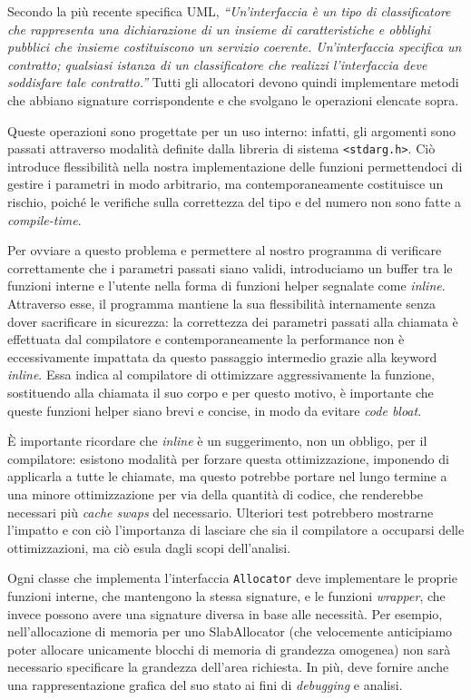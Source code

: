 Secondo la più recente specifica UML,  \textit{“Un'interfaccia è un tipo di classificatore che rappresenta una dichiarazione di un insieme di caratteristiche e obblighi pubblici che insieme costituiscono un servizio coerente. Un'interfaccia specifica un contratto; qualsiasi istanza di un classificatore che realizzi l'interfaccia deve soddisfare tale contratto.”} Tutti gli allocatori devono quindi implementare metodi che abbiano signature corrispondente e che svolgano le operazioni elencate sopra.



Queste operazioni sono progettate per un uso interno: infatti, gli argomenti sono passati attraverso modalità definite dalla libreria di sistema \texttt{<stdarg.h>}. Ciò introduce flessibilità nella nostra implementazione delle funzioni permettendoci di gestire i parametri in modo arbitrario, ma contemporaneamente costituisce un rischio, poiché le verifiche sulla correttezza del tipo e del numero non sono fatte a \textit{compile-time}.

Per ovviare a questo problema e permettere al nostro programma di verificare correttamente che i parametri passati siano validi, introduciamo un buffer tra le funzioni interne e l’utente nella forma di funzioni helper segnalate come \textit{inline}. Attraverso esse, il programma mantiene la sua flessibilità internamente senza dover sacrificare in sicurezza: la correttezza dei parametri passati alla chiamata è effettuata dal compilatore e contemporaneamente la performance non è eccessivamente impattata da questo passaggio intermedio grazie alla keyword \textit{inline}. Essa indica al compilatore di ottimizzare aggressivamente la funzione, sostituendo alla chiamata il suo corpo e per questo motivo, è importante che queste funzioni helper siano brevi e concise, in modo da evitare \textit{code bloat}.

È importante ricordare che \textit{inline} è un suggerimento, non un obbligo, per il compilatore: esistono modalità per forzare questa ottimizzazione, imponendo di applicarla a tutte le chiamate, ma questo potrebbe portare nel lungo termine a una minore ottimizzazione per via della quantità di codice, che renderebbe necessari più \textit{cache swaps} del necessario. Ulteriori test potrebbero mostrarne l’impatto e con ciò l’importanza di lasciare che sia il compilatore a occuparsi delle ottimizzazioni, ma ciò esula dagli scopi dell’analisi.

Ogni classe che implementa l’interfaccia \texttt{Allocator} deve implementare le proprie funzioni interne, che mantengono la stessa signature, e le funzioni \textit{wrapper}, che invece possono avere una signature diversa in base alle necessità. Per esempio, nell’allocazione di memoria per uno SlabAllocator (che velocemente anticipiamo poter allocare unicamente blocchi di memoria di grandezza omogenea) non sarà necessario specificare la grandezza dell’area richiesta. In più, deve fornire anche una rappresentazione grafica del suo stato ai fini di \textit{debugging} e analisi.

